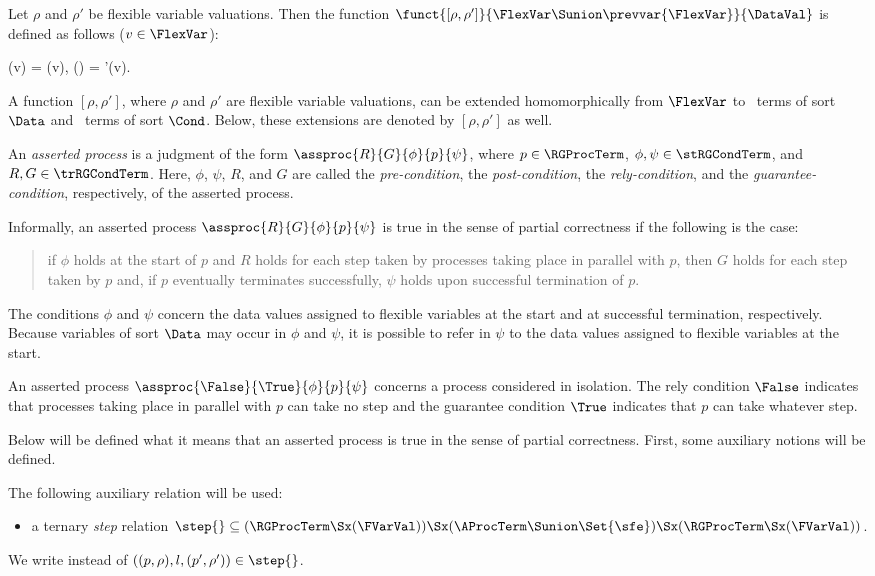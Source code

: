 \documentclass[runningheads]{llncs}
\begin{document}
Let $\rho$ and $\rho'$ be flexible variable valuations.
Then the function 
$\funct{[\rho,\rho']}{\FlexVar \Sunion \prevvar{\FlexVar}}{\DataVal}$ is
defined as follows ($v \in \FlexVar$):
\begin{ldispl}
(v)           = \rho(v)\;,  () = \rho'(v)\;.
\end{ldispl}%
A function $[\rho,\rho']$, where $\rho$ and $\rho'$ are flexible 
variable valuations, can be extended homomorphically 
from $\FlexVar$ to \deACPei\ terms of sort $\Data$ and \deACPei\ 
terms of sort $\Cond$.
Below, these extensions are denoted by $[\rho,\rho']$ as well.

An \emph{asserted process} is a judgment of the form 
$\assproc{R}{G}{\phi}{p}{\psi}$, where $p \in \RGProcTerm$,
$\phi,\psi \in \stRGCondTerm$, and $R,G \in \trRGCondTerm$.  
Here, $\phi$, $\psi$, $R$, and $G$ are called the \emph{pre-condition}, 
the \emph{post-condition}, the \emph{rely-condition}, and
the \emph{guarantee-condition}, respectively, of the asserted process.

Informally, an asserted process $\assproc{R}{G}{\phi}{p}{\psi}$ is true 
in the sense of partial \linebreak[2] correctness if the following is 
the case:
\begin{quote}
if $\phi$ holds at the start of $p$ and $R$ holds for each step taken by
processes taking place in parallel with $p$, then 
$G$ holds for each step taken by $p$ and, if $p$ eventually terminates 
successfully, $\psi$ holds upon successful termination of $p$.
\end{quote}
%
The conditions $\phi$ and $\psi$ concern the data values assigned to 
flexible variables at the start and at successful termination, 
respectively.
Because variables of sort $\Data$ may occur in $\phi$ and $\psi$, it is 
possible to refer in $\psi$ to the data values assigned to flexible 
variables at the start.

An asserted process $\assproc{\False}{\True}{\phi}{p}{\psi}$ concerns a
process considered in isolation.
The rely condition $\False$ indicates that processes taking place in 
parallel with $p$ can take no step and the guarantee condition $\True$ 
indicates that $p$ can take whatever step.

Below will be defined what it means that an asserted process is true in 
the sense of partial correctness.
First, some auxiliary notions will be defined.

The following auxiliary relation will be used:
\begin{itemize}
\item 
a ternary \emph{step} relation 
${\step{}} \subseteq
 (\RGProcTerm \Sx (\FVarVal)) \Sx (\AProcTerm \Sunion \Set{\sfe}) \Sx
 (\RGProcTerm \Sx (\FVarVal))$.
\end{itemize}
We write  instead of 
$((p,\rho),l,(p',\rho')) \in {\step{}}$.
\end{document}
